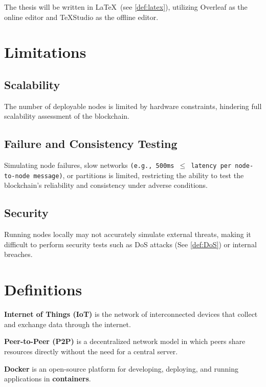 \documentclass[twocolumn]{article}
\begin{document}
\noindent The thesis will be written in \LaTeX\ (see \cref{def:latex}), utilizing Overleaf as the online editor and \TeX Studio as the offline editor.


\newpage
\section{Limitations}
\subsection{Scalability}
\vspace{-10pt}
The number of deployable nodes is limited by hardware constraints, hindering full scalability assessment of the blockchain.
\vspace{-20pt}

\subsection{Failure and Consistency Testing}
\vspace{-10pt}
Simulating node failures, slow networks \texttt{(e.g., 500ms $\le$ latency per node-to-node message)}, or partitions is limited, restricting the ability to test the blockchain’s reliability and consistency under adverse conditions.
\vspace{-20pt}

\subsection{Security}
\vspace{-10pt}
Running nodes locally may not accurately simulate external threats, making it difficult to perform security tests such as DoS attacks (See \cref{def:DoS})  or internal breaches.

\section{Definitions}

\label{def:iot}
\noindent\textbf{Internet of Things (IoT)} is the network of interconnected devices that collect and exchange data through the internet.


\label{def:p2p}
\noindent\textbf{Peer-to-Peer (P2P)} is a decentralized network model in which peers share resources directly without the need for a central server.

\label{def:docker}
\noindent \textbf{Docker} is an open-source platform for developing, deploying, and running applications in \textbf{containers}.
\end{document}
